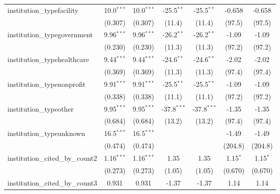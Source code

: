 \begin{tabular}{lcccccc}
   institution\_typefacility             & 10.0$^{***}$  & 10.0$^{***}$  & -25.5$^{**}$  & -25.5$^{**}$  & -0.658        & -0.658\\   
                                         & (0.307)       & (0.307)       & (11.4)        & (11.4)        & (97.5)        & (97.5)\\   
   institution\_typegovernment           & 9.96$^{***}$  & 9.96$^{***}$  & -26.2$^{**}$  & -26.2$^{**}$  & -1.09         & -1.09\\   
                                         & (0.230)       & (0.230)       & (11.3)        & (11.3)        & (97.2)        & (97.2)\\   
   institution\_typehealthcare           & 9.44$^{***}$  & 9.44$^{***}$  & -24.6$^{**}$  & -24.6$^{**}$  & -2.02         & -2.02\\   
                                         & (0.369)       & (0.369)       & (11.3)        & (11.3)        & (97.4)        & (97.4)\\   
   institution\_typenonprofit            & 9.91$^{***}$  & 9.91$^{***}$  & -25.5$^{**}$  & -25.5$^{**}$  & -1.09         & -1.09\\   
                                         & (0.338)       & (0.338)       & (11.1)        & (11.1)        & (97.2)        & (97.2)\\   
   institution\_typeother                & 9.95$^{***}$  & 9.95$^{***}$  & -37.8$^{***}$ & -37.8$^{***}$ & -1.35         & -1.35\\   
                                         & (0.684)       & (0.684)       & (13.2)        & (13.2)        & (97.4)        & (97.4)\\   
   institution\_typeunknown              & 16.5$^{***}$  & 16.5$^{***}$  &               &               & -1.49         & -1.49\\   
                                         & (0.474)       & (0.474)       &               &               & (204.8)       & (204.8)\\   
   institution\_cited\_by\_count2        & 1.16$^{***}$  & 1.16$^{***}$  & 1.35          & 1.35          & 1.15$^{*}$    & 1.15$^{*}$\\   
                                         & (0.273)       & (0.273)       & (1.05)        & (1.05)        & (0.670)       & (0.670)\\   
   institution\_cited\_by\_count3        & 0.931         & 0.931         & -1.37         & -1.37         & 1.14          & 1.14\\   

\end{tabular}

